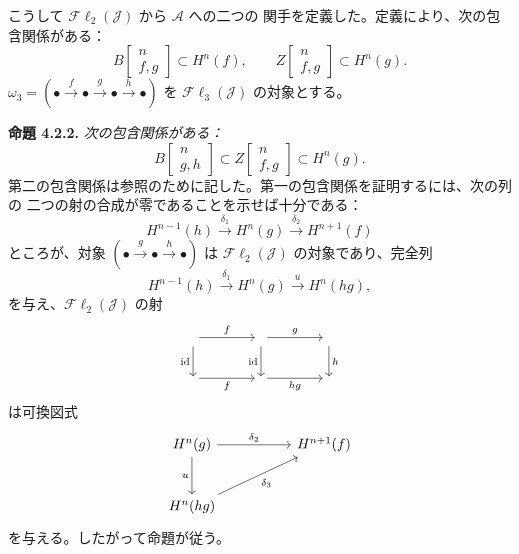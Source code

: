 \clearpage
{}%
\begingroup\small\setlength{\parskip}{0pt}\setlength{\emergencystretch}{1.5em}
こうして $\mathcal{F}\ell_2(\mathcal J)$ から $\mathcal A$ への二つの
関手を定義した。定義により、次の包含関係がある：
\[
B\!\left[\begin{smallmatrix}n\\f,g\end{smallmatrix}\right]\subset H^n(f),
\qquad
Z\!\left[\begin{smallmatrix}n\\f,g\end{smallmatrix}\right]\subset H^n(g).
\]
$\omega_3=(\mathord\bullet\xrightarrow f\mathord\bullet\xrightarrow g
\mathord\bullet\xrightarrow h\mathord\bullet)$ を
$\mathcal{F}\ell_3(\mathcal J)$ の対象とする。

\medskip\noindent\textbf{命題 4.2.2.}\quad
\textit{次の包含関係がある：}
\[
B\!\left[\begin{smallmatrix}n\\g,h\end{smallmatrix}\right]
\subset
Z\!\left[\begin{smallmatrix}n\\f,g\end{smallmatrix}\right]
\subset H^n(g).
\]
第二の包含関係は参照のために記した。第一の包含関係を証明するには、次の列の
二つの射の合成が零であることを示せば十分である：
\[
H^{n-1}(h)\xrightarrow{\delta_1}H^n(g)
\xrightarrow{\delta_2}H^{n+1}(f)
\]
ところが、対象
$(\mathord\bullet\xrightarrow g\mathord\bullet\xrightarrow h\mathord\bullet)$
は $\mathcal{F}\ell_2(\mathcal J)$ の対象であり、完全列
\[
H^{n-1}(h)\xrightarrow{\delta_1}H^n(g)
\xrightarrow u H^n(hg),
\]
を与え、$\mathcal{F}\ell_2(\mathcal J)$ の射
\[
\begin{tikzcd}[column sep=4em,row sep=2.2em]
{}\arrow[r,"f"]\arrow[d,"\operatorname{id}"']&{}
 \arrow[r,"g"]\arrow[d,"\operatorname{id}"']&{}\arrow[d,"h"]\\
{}\arrow[r,"f"']&{}\arrow[r,"hg"']&{}
\end{tikzcd}
\]
は可換図式
\[
\begin{tikzcd}[column sep=5em,row sep=2.7em]
H^n(g)\arrow[r,"\delta_2"]\arrow[d,"u"']&H^{n+1}(f)\\
H^n(hg)\arrow[ur,"\delta_3"']&{}
\end{tikzcd}
\]
を与える。したがって命題が従う。
\endgroup
